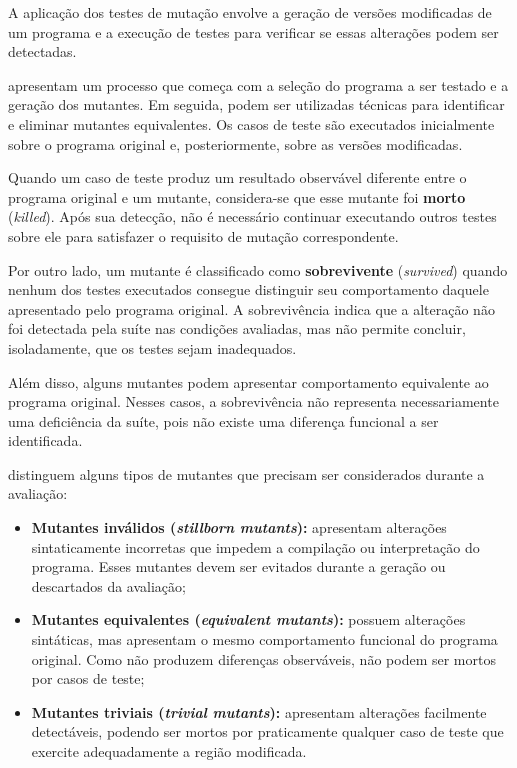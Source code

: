A aplicação dos testes de mutação envolve a geração de versões modificadas de um programa e a execução de testes para verificar se essas alterações podem ser detectadas.

 apresentam um processo que começa com a seleção do programa a ser testado e a geração dos mutantes. Em seguida, podem ser utilizadas técnicas para identificar e eliminar mutantes equivalentes. Os casos de teste são executados inicialmente sobre o programa original e, posteriormente, sobre as versões modificadas.

Quando um caso de teste produz um resultado observável diferente entre o programa original e um mutante, considera-se que esse mutante foi \textbf{morto} (\textit{killed}). Após sua detecção, não é necessário continuar executando outros testes sobre ele para satisfazer o requisito de mutação correspondente.

Por outro lado, um mutante é classificado como \textbf{sobrevivente} (\textit{survived}) quando nenhum dos testes executados consegue distinguir seu comportamento daquele apresentado pelo programa original. A sobrevivência indica que a alteração não foi detectada pela suíte nas condições avaliadas, mas não permite concluir, isoladamente, que os testes sejam inadequados.

Além disso, alguns mutantes podem apresentar comportamento equivalente ao programa original. Nesses casos, a sobrevivência não representa necessariamente uma deficiência da suíte, pois não existe uma diferença funcional a ser identificada.

 distinguem alguns tipos de mutantes que precisam ser considerados durante a avaliação:

\begin{itemize}
    \item \textbf{Mutantes inválidos (\textit{stillborn mutants}):} apresentam alterações sintaticamente incorretas que impedem a compilação ou interpretação do programa. Esses mutantes devem ser evitados durante a geração ou descartados da avaliação;

    \item \textbf{Mutantes equivalentes (\textit{equivalent mutants}):} possuem alterações sintáticas, mas apresentam o mesmo comportamento funcional do programa original. Como não produzem diferenças observáveis, não podem ser mortos por casos de teste;

    \item \textbf{Mutantes triviais (\textit{trivial mutants}):} apresentam alterações facilmente detectáveis, podendo ser mortos por praticamente qualquer caso de teste que exercite adequadamente a região modificada.
\end{itemize}

